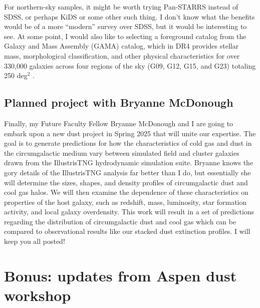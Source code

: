 \documentclass[11pt, oneside]{article}   	%
\begin{document}
For northern-sky samples, it might be worth trying Pan-STARRS instead of SDSS, or perhaps KiDS or some other such thing. I don't know what the benefits would be of a more ``modern'' survey over SDSS, but it would be interesting to see. At some point, I would also like to selecting a foreground catalog from the Galaxy and Mass Assembly (GAMA) catalog, which in DR4 provides stellar mass, morphological classification, and  other physical characteristics for over 330,000 galaxies across four regions of the sky (G09, G12, G15, and G23) totaling 250 deg$^2$ \cite{2011MNRAS.413..971D, 2022MNRAS.513..439D}. 

\subsection{Planned project with Bryanne McDonough}\label{sec:bryanne}

Finally, my Future Faculty Fellow Bryanne McDonough and I are going to embark upon a new dust project in Spring 2025 that will unite our expertise. The goal is to generate predictions for how the characteristics of cold gas and dust in the circumgalactic medium vary between simulated field and cluster galaxies drawn from the IllustrisTNG hydrodynamic simulation suite. Bryanne knows the gory details of the IllustrisTNG analysis far better than I do, but essentially she will determine the sizes, shapes, and density profiles of circumgalactic dust and cool gas halos. We will then examine the dependence of these characteristics on properties of the host galaxy, such as redshift, mass, luminosity, star formation activity, and local galaxy overdensity. This work will result in a set of predictions regarding the distribution of circumgalactic dust and cool gas which can be compared to observational results like our stacked dust extinction profiles. I will keep you all posted!

\section{Bonus: updates from Aspen dust workshop}\label{sec:aspen}
\end{document}
